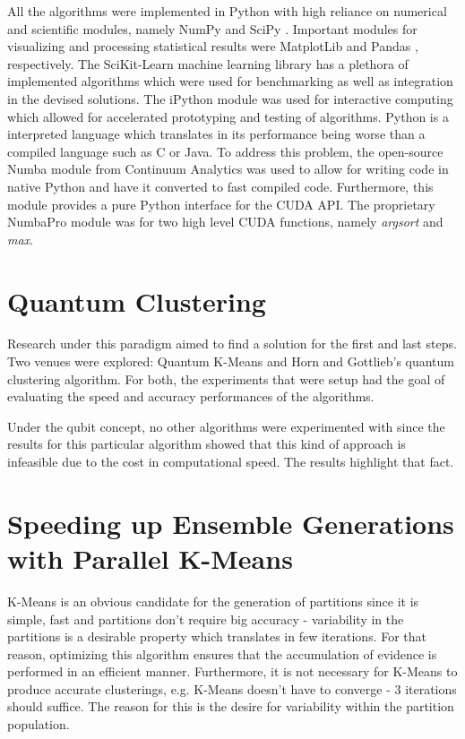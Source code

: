 All the algorithms were implemented in Python with high reliance on numerical and scientific modules, namely NumPy \cite{VanDerWalt2011} and SciPy \cite{JonesSciPy,Oliphant2007,Millman2011}.
Important modules for visualizing and processing statistical results were MatplotLib \cite{hunter2007matplotlib} and Pandas \cite{McKinney2010}, respectively.
The SciKit-Learn \cite{Pedregosa2012} machine learning library has a plethora of implemented algorithms which were used for benchmarking as well as integration in the devised solutions.
The iPython \cite{Perez2007} module was used for interactive computing which allowed for accelerated prototyping and testing of algorithms.
Python is a interpreted language which translates in its performance being worse than a compiled language such as C or Java.
To address this problem, the open-source Numba module from Continuum Analytics was used to allow for writing code in native Python and have it converted to fast compiled code.
Furthermore, this module provides a pure Python interface for the CUDA API.
The proprietary NumbaPro module was for two high level CUDA functions, namely \emph{argsort} and \emph{max}. %


\section{Quantum Clustering}

Research under this paradigm aimed to find a solution for the first and last steps.
Two venues were explored: Quantum K-Means and Horn and Gottlieb's quantum clustering algorithm.
For both, the experiments that were setup had the goal of evaluating the speed and accuracy performances of the algorithms.

Under the qubit concept, no other algorithms were experimented with since the results for this particular algorithm showed that this kind of approach is infeasible due to the cost in computational speed.
The results highlight that fact.



\section{Speeding up Ensemble Generations with Parallel K-Means}
K-Means is an obvious candidate for the generation of partitions since it is simple, fast and partitions don't require big accuracy - variability in the partitions is a desirable property which translates in few iterations.
For that reason, optimizing this algorithm ensures that the accumulation of evidence is performed in an efficient manner.
Furthermore, it is not necessary for K-Means to produce accurate clusterings, e.g. K-Means doesn't have to converge - 3 iterations should suffice.
The reason for this is the desire for variability within the partition population.



